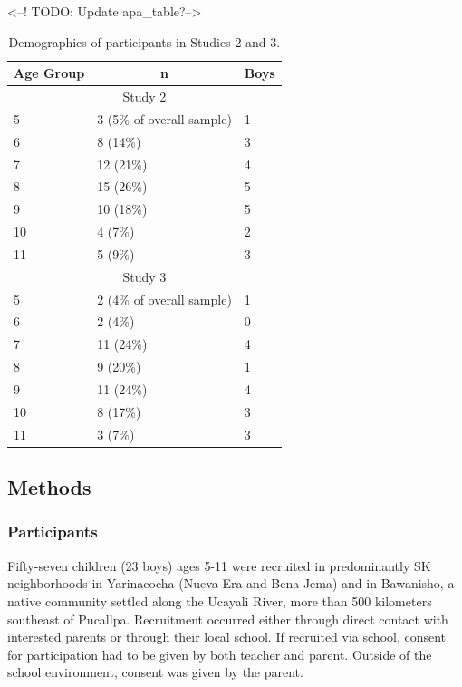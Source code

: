 \documentclass[
  ,apa7,floatsintext]{apa6}
\begin{document}
\textless--! TODO: Update apa\_table?--\textgreater{}

\begin{table}[tbp]

\begin{center}
\begin{threeparttable}

\caption{\label{tab:study23-demographics}Demographics of participants in Studies 2 and 3.}

\begin{tabular}{lll}
\toprule
Age Group & \multicolumn{1}{c}{n} & \multicolumn{1}{c}{Boys}\\
\midrule
\multicolumn{3}{c}{Study 2}\\
5 & 3 (5\% of overall sample) & 1\\
6 & 8 (14\%) & 3\\
7 & 12 (21\%) & 4\\
8 & 15 (26\%) & 5\\
9 & 10 (18\%) & 5\\
10 & 4 (7\%) & 2\\
11 & 5 (9\%) & 3\\
\multicolumn{3}{c}{Study 3}\\
5 & 2 (4\% of overall sample) & 1\\
6 & 2 (4\%) & 0\\
7 & 11 (24\%) & 4\\
8 & 9 (20\%) & 1\\
9 & 11 (24\%) & 4\\
10 & 8 (17\%) & 3\\
11 & 3 (7\%) & 3\\
\bottomrule
\end{tabular}

\end{threeparttable}
\end{center}

\end{table}

\hypertarget{methods-1}{%
\subsection{Methods}\label{methods-1}}

\hypertarget{participants-1}{%
\subsubsection{Participants}\label{participants-1}}

Fifty-seven children (23 boys) ages 5-11 were recruited in predominantly SK neighborhoods in Yarinacocha (Nueva Era and Bena Jema) and in Bawanisho, a native community settled along the Ucayali River, more than 500 kilometers southeast of Pucallpa. Recruitment occurred either through direct contact with interested parents or through their local school. If recruited via school, consent for participation had to be given by both teacher and parent. Outside of the school environment, consent was given by the parent.
\end{document}

